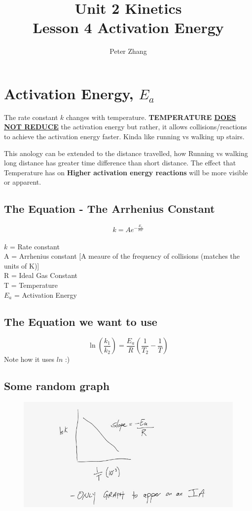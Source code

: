 \documentclass{article}
\title{Unit 2 Kinetics\\Lesson 4 Activation Energy}
\author{Peter Zhang}
\begin{document}
\maketitle
\newpage
\tableofcontents
\newpage

\section{Activation Energy, $E_{a}$}
The rate constant $k$ changes with temperature. \textbf{TEMPERATURE \underline{DOES NOT REDUCE}} the activation energy but rather, it allows collisions/reactions to achieve the activation energy faster. Kinda like running vs walking up stairs.

This anology can be extended to the distance travelled, how Running vs walking long distance has greater time difference than short distance. The effect that Temperature has on \textbf{Higher activation energy reactions} will be more visible or apparent.

\subsection{The Equation - The Arrhenius Constant}
$$k = Ae^{-\frac{E_{a}}{RT}}$$ \\$k$ = Rate constant\\A = Arrhenius constant [A meaure of the frequency of collisions (matches the units of K)]\\R = Ideal Gas Constant\\T = Temperature\\$E_{a}$ = Activation Energy

\subsection{The Equation we want to use}
$$\ln{(\frac{k_{1}}{k_{2}})} = \frac{E_{a}}{R}(\frac{1}{T_{2}} - \frac{1}{T})$$
Note how it uses $ln$ :)


\subsection{Some random graph}

\begin{figure}[H]
\centering
\includegraphics[width=\textwidth]{2.4fig1.jpg}
\end{figure}
\end{document}
